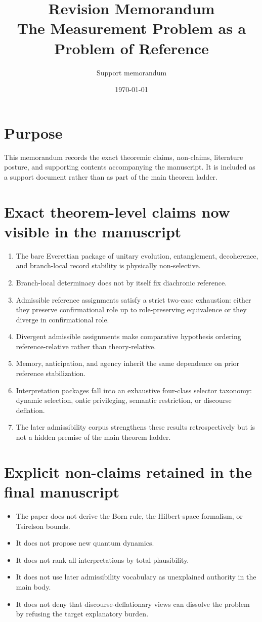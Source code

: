 \documentclass[11pt]{article}
\title{Revision Memorandum\\\large The Measurement Problem as a Problem of Reference}
\author{Support memorandum}
\date{\today}
\begin{document}
\maketitle

\section*{Purpose}
This memorandum records the exact theoremic claims, non-claims, literature posture, and supporting contents accompanying the manuscript. It is included as a support document rather than as part of the main theorem ladder.

\section*{Exact theorem-level claims now visible in the manuscript}
\begin{enumerate}
\item The bare Everettian package of unitary evolution, entanglement, decoherence, and branch-local record stability is physically non-selective.
\item Branch-local determinacy does not by itself fix diachronic reference.
\item Admissible reference assignments satisfy a strict two-case exhaustion: either they preserve confirmational role up to role-preserving equivalence or they diverge in confirmational role.
\item Divergent admissible assignments make comparative hypothesis ordering reference-relative rather than theory-relative.
\item Memory, anticipation, and agency inherit the same dependence on prior reference stabilization.
\item Interpretation packages fall into an exhaustive four-class selector taxonomy: dynamic selection, ontic privileging, semantic restriction, or discourse deflation.
\item The later admissibility corpus strengthens these results retrospectively but is not a hidden premise of the main theorem ladder.
\end{enumerate}

\section*{Explicit non-claims retained in the final manuscript}
\begin{itemize}
\item The paper does not derive the Born rule, the Hilbert-space formalism, or Tsirelson bounds.
\item It does not propose new quantum dynamics.
\item It does not rank all interpretations by total plausibility.
\item It does not use later admissibility vocabulary as unexplained authority in the main body.
\item It does not deny that discourse-deflationary views can dissolve the problem by refusing the target explanatory burden.
\end{itemize}
\end{document}
